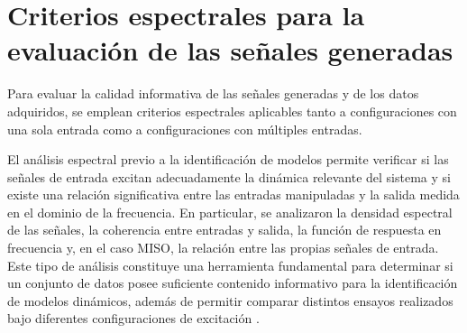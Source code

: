 \documentclass[11pt]{report}
\begin{document}

\section{Criterios espectrales para la evaluación de las señales generadas}
Para evaluar la calidad informativa de las señales generadas y de los datos adquiridos, se emplean criterios espectrales aplicables tanto a configuraciones con una sola entrada como a configuraciones con múltiples entradas. 

El análisis espectral previo a la identificación de modelos permite verificar si las señales de entrada excitan adecuadamente la dinámica relevante del sistema y si existe una relación significativa entre las entradas manipuladas y la salida medida en el dominio de la frecuencia. En particular, se analizaron la densidad espectral de las señales, la coherencia entre entradas y salida, la función de respuesta en frecuencia y, en el caso MISO, la relación entre las propias señales de entrada. Este tipo de análisis constituye una herramienta fundamental para determinar si un conjunto de datos posee suficiente contenido informativo para la identificación de modelos dinámicos, además de permitir comparar distintos ensayos realizados bajo diferentes configuraciones de excitación \cite{ljung1999system}.
\end{document}

